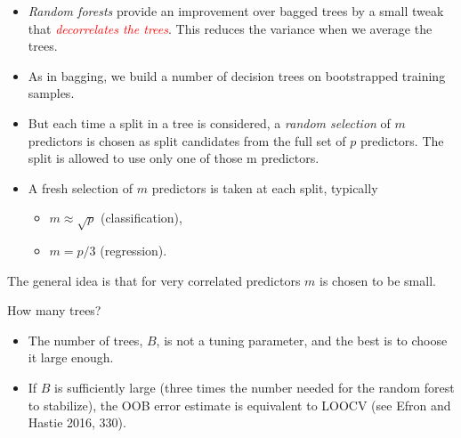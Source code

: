 \documentclass[10pt,ignorenonframetext,]{beamer}
\providecommand{\tightlist}{%
  \setlength{\itemsep}{0pt}\setlength{\parskip}{0pt}}
\begin{document}
\begin{frame}

\begin{itemize}
\item
  \emph{Random forests} provide an improvement over bagged trees by a
  small tweak that \emph{\textcolor{red}{decorrelates the trees}}. This
  reduces the variance when we average the trees.
\item
  As in bagging, we build a number of decision trees on bootstrapped
  training samples.
\item
  But each time a split in a tree is considered, a \emph{random
  selection} of \(m\) predictors is chosen as split candidates from the
  full set of \(p\) predictors. The split is allowed to use only one of
  those m predictors.
\item
  A fresh selection of \(m\) predictors is taken at each split,
  typically

  \begin{itemize}
  \tightlist
  \item
    \(m\approx \sqrt p\) (classification),\\
  \item
    \(m=p/3\) (regression).
  \end{itemize}
\end{itemize}

\vspace{2mm}

The general idea is that for very correlated predictors \(m\) is chosen
to be small.

\end{frame}

\begin{frame}

\begin{block}{How many trees?}

\begin{itemize}
\item
  The number of trees, \(B\), is not a tuning parameter, and the best is
  to choose it large enough.
\item
  If \(B\) is sufficiently large (three times the number needed for the
  random forest to stabilize), the OOB error estimate is equivalent to
  LOOCV (see Efron and Hastie 2016, 330).
\end{itemize}

\end{block}

\end{frame}
\end{document}
